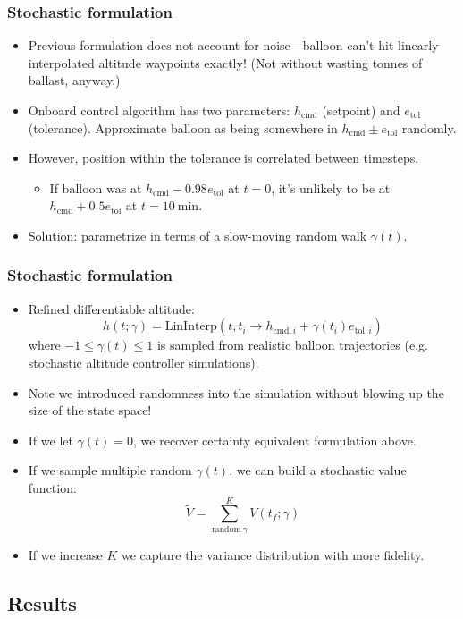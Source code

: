 \documentclass[10pt,mathserif]{beamer}
\begin{document}
\begin{frame}
\frametitle{Stochastic formulation}
\begin{itemize}
\item Previous formulation does not account for noise---balloon can't hit linearly interpolated altitude waypoints exactly! (Not without wasting tonnes of ballast, anyway.)
\item Onboard control algorithm has two parameters: $h_\text{cmd}$ (setpoint) and $e_\text{tol}$ (tolerance). Approximate balloon as being somewhere in $h_\text{cmd}\pm e_\text{tol}$ randomly.
\item However, position within the tolerance is correlated between timesteps.
\begin{itemize}
\item If balloon was at $h_\text{cmd} - 0.98e_\text{tol}$ at $t=0$, it's unlikely to be at $h_\text{cmd} + 0.5e_\text{tol}$ at $t=10~\text{min}$.
\end{itemize}
\item Solution: parametrize in terms of a slow-moving random walk $\gamma(t)$.
\end{itemize}
\end{frame}

\begin{frame}
\frametitle{Stochastic formulation}

\begin{itemize}
\item Refined differentiable altitude:
\[h(t; \gamma) =
\text{LinInterp}\left(t, t_i \to h_{\text{cmd},i} + \gamma(t_i) e_{\text{tol},i}\right)
\]
where $-1 \leq \gamma(t) \leq 1$ is sampled from realistic balloon trajectories (e.g. stochastic altitude controller simulations).
\item Note we introduced randomness into the simulation without blowing up the size of the state space!
\item If we let $\gamma(t)=0$, we recover certainty equivalent formulation above.
\item If we sample multiple random $\gamma(t)$, we can build a stochastic value function:
\[\tilde V = \sum_{\text{random}~\gamma}^K V(t_f; \gamma)\]
\item If we increase $K$ we capture the variance distribution with more fidelity.
\end{itemize}
\end{frame}


\subsection{Results}
\end{document}
